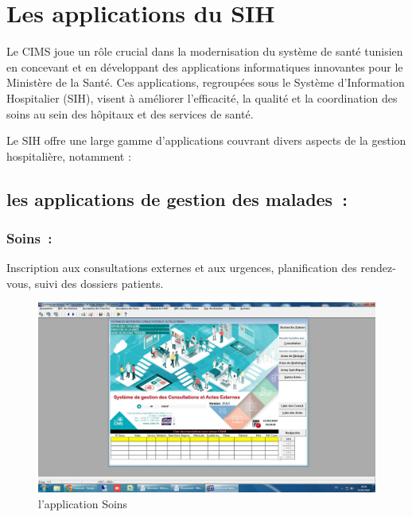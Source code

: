 \documentclass[12pt]{rapportINPTCLOUD}
\begin{document}
	\chapter{\textcolor{chapitrecolor}{Les applications du SIH}}
	Le CIMS joue un rôle crucial dans la modernisation du système de santé tunisien en concevant et en développant des applications informatiques innovantes pour le Ministère de la Santé. Ces applications, regroupées sous le Système d'Information Hospitalier (SIH), visent à améliorer l'efficacité, la qualité et la coordination des soins au sein des hôpitaux et des services de santé.
	
	Le SIH offre une large gamme d'applications couvrant divers aspects de la gestion hospitalière, notamment :
	\section{\textcolor{sectioncolor}{les applications de gestion des malades :}}
	\subsection{Soins :} Inscription aux consultations externes et aux urgences, planification des rendez-vous, suivi des dossiers patients.
	\begin{figure}[H]
		\centering
		\includegraphics[width=1\linewidth]{img/a.jpg}
		\caption{l'application Soins}
		\label{fig:Soins}
	\end{figure}	
\newpage
\end{document}
